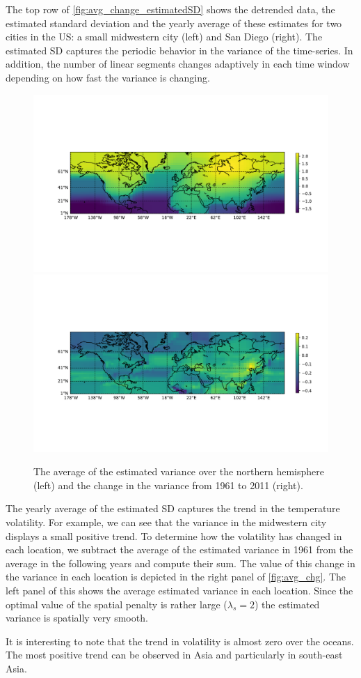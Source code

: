 \documentclass{article}
\begin{document}
The top row of \autoref{fig:avg_change_estimatedSD} shows the
detrended data, the estimated standard deviation and the yearly
average of these estimates for two cities in the US: a small
midwestern city (left) and San Diego (right). The estimated SD
captures the periodic behavior in the variance of the time-series. In
addition, the number of linear segments changes adaptively in each
time window depending on how fast the variance is changing.  
\begin{figure}[tb]
  \centering
  \includegraphics[width=.45\linewidth]{Figures/avg_logVar.pdf}
  \includegraphics[width=.45\linewidth]{Figures/avg_change_logVar.pdf}
  \caption{The
    average of the estimated variance over the northern hemisphere (left) and the
    change in the variance from 1961 to 2011 (right).}
\label{fig:avg_chg}
\end{figure}

The yearly average of the estimated SD captures the trend in the
temperature volatility. For example, we can see that the variance in
the midwestern city displays a small positive trend. To determine how the volatility has
changed in each location, we subtract the average of the estimated
variance in 1961 from the average in the following years and compute
their sum. The value of this change in the variance in each location
is depicted in the right panel of
\autoref{fig:avg_chg}. The left panel of this
shows the average estimated variance in each location. Since the
optimal value of the spatial penalty is rather large ($\lambda_s=2$)
the estimated variance is spatially very smooth. 

It is interesting to note that the trend in volatility is almost zero
over the oceans. The most positive trend can be observed in Asia and
particularly in south-east Asia. 
\end{document}
